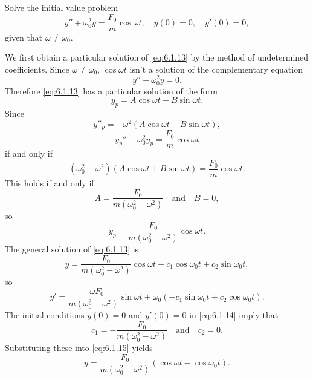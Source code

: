 \documentclass{ximera}
\begin{document}
\begin{example}\label{example:6.1.4}
 Solve the initial value problem
\begin{equation}\label{eq:6.1.14}
y''+\omega_0^2y=\frac{F_0}{m}\cos\omega t, \quad  y(0)=0,\quad y'(0)=0,
\end{equation}
 given that $\omega\neq\omega_0$.



\begin{explanation}
We first obtain a particular solution of \eqref{eq:6.1.13} by the method
of undetermined coefficients. Since $\omega\ne\omega _0$,
 $\cos\omega t$ isn't  a solution of the complementary equation
$$
y''+\omega_0^2y=0.
$$
Therefore \eqref{eq:6.1.13} has a particular solution of the form
$$
y_p=A\cos\omega t+B\sin\omega t.
$$
Since
$$
y''_p=-\omega^2(A\cos\omega t+B\sin\omega t),
$$
$$
y_p''+\omega_0^2y_p=\frac{F_0}{m}\cos\omega t
$$
if and only if
$$
(\omega_0^2-\omega^2)\left(A\cos\omega t+
B\sin\omega t\right)=\frac{F_0}{m}\cos\omega t.
$$
 This holds if and only if
$$
A=\frac{F_0}{m(\omega_0^2-\omega^2)}\quad\mbox{and}\quad B=0,
$$
so
$$
y_p=\frac{F_0}{m(\omega_0^2-\omega^2)}\cos\omega t.
$$
The general solution of \eqref{eq:6.1.13}  is
\begin{equation}\label{eq:6.1.15}
y=\frac{F_0}{m(\omega_0^2-\omega^2)}\cos\omega t
+c_1\cos\omega_0 t+c_2\sin\omega_0t,
\end{equation}
so
$$
y'=\frac{-\omega F_0}{m(\omega_0^2-\omega^2)}\sin\omega t
+\omega_0(-c_1\sin\omega_0 t+c_2\cos\omega_0t).
$$
The initial conditions $y(0)=0$ and $y'(0)=0$ in \eqref{eq:6.1.14} imply
that
$$
c_1=-\frac{F_0}{m(\omega_0^2-\omega^2)}\quad\mbox{and}\quad
c_2=0.
$$
Substituting these into \eqref{eq:6.1.15} yields
\begin{equation}\label{eq:6.1.16}
y=\frac{F_0}{m(\omega_0^2-\omega^2)}(\cos\omega t-\cos\omega
_0t).
\end{equation}


\end{explanation}
\end{example}
\end{document}
